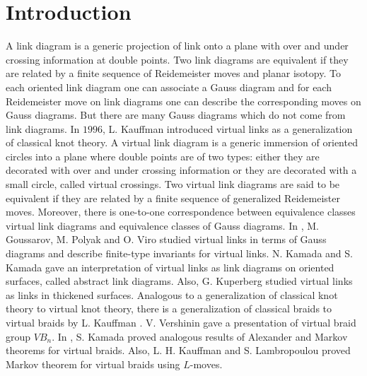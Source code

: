 \documentclass[11 pt, reqno]{amsart}
\theoremstyle{definition}
\numberwithin{equation}{subsection}
\begin{document}
\section{Introduction}

A link diagram is a generic projection of link onto a plane with over and under crossing information at double points. Two link diagrams are equivalent if they are related by a finite sequence of Reidemeister moves and planar isotopy. To each oriented link diagram one can associate a Gauss diagram and for each Reidemeister move on link diagrams one can describe the corresponding moves on Gauss diagrams. But there are many Gauss diagrams which do not come from link diagrams. In $1996$, L. Kauffman \cite{Kauffman-1} introduced virtual links as a generalization of classical knot theory. A virtual link diagram is a generic immersion of oriented circles into a plane where double points are of two types: either they are decorated with over and under crossing information or they are decorated with a small circle, called virtual crossings. Two virtual link diagrams are said to be equivalent if they are related by a finite sequence of generalized Reidemeister moves. Moreover, there is one-to-one correspondence between equivalence classes virtual link diagrams and equivalence classes of Gauss diagrams. In \cite{GPV-1}, M. Goussarov, M. Polyak and O. Viro studied virtual links in terms of Gauss diagrams and describe finite-type invariants for virtual links. N. Kamada and S. Kamada \cite{KK-1} gave an interpretation of virtual links as link diagrams on oriented surfaces, called abstract link diagrams. Also, G. Kuperberg \cite{Kuperberg-1} studied virtual links as links in thickened surfaces. Analogous to a generalization of classical knot theory to virtual knot theory, there is a generalization of classical braids to virtual braids by L. Kauffman \cite{Kauffman-1}. V. Vershinin \cite{VV-1} gave a presentation of virtual braid group $VB_n$. In \cite{Kamada-1}, S. Kamada proved analogous results of Alexander and Markov theorems for virtual braids. Also, L. H. Kauffman and S. Lambropoulou \cite{KL-1} proved Markov theorem for virtual braids using $L$-moves.
\par 
\end{document}
